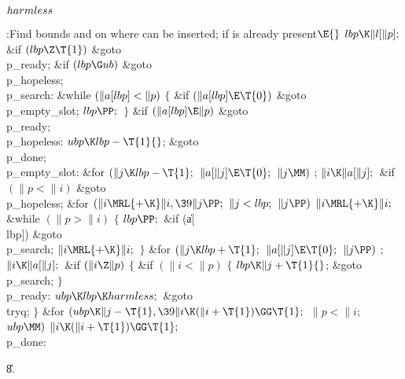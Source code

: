 \Y\B\4\D$\\{harmless}$ \5
\par
\Y\B\4:Find bounds  and  on where  can be
inserted;  if  is already present\X${}\E{}$\6
$\\{lbp}\K\|l[\|p];{}$\6
\&{if} ${}(\\{lbp}\Z\T{1}){}$\1\5
\&{goto} \\{p\_ready};\2\6
\&{if} ${}(\\{lbp}\G\\{ub}){}$\1\5
\&{goto} \\{p\_hopeless};\2\6
\4\\{p\_search}:\5
\&{while} ${}(\|a[\\{lbp}]<\|p){}$\5
${}\{{}$\1\6
\&{if} ${}(\|a[\\{lbp}]\E\T{0}){}$\1\5
\&{goto} \\{p\_empty\_slot};\2\6
${}\\{lbp}\PP;{}$\6
\4${}\}{}$\2\6
\&{if} ${}(\|a[\\{lbp}]\E\|p){}$\1\5
\&{goto} \\{p\_ready};\2\6
\4\\{p\_hopeless}:\5
${}\\{ubp}\K\\{lbp}-\T{1}{}$;\5
\&{goto} \\{p\_done};\6
\4\\{p\_empty\_slot}:\5
\&{for} ${}(\|j\K\\{lbp}-\T{1};{}$ ${}\|a[\|j]\E\T{0};{}$ ${}\|j\MM){}$\1\5
;\2\6
${}\|i\K\|a[\|j];{}$\6
\&{if} ${}(\|p<\|i){}$\1\5
\&{goto} \\{p\_hopeless};\2\6
\&{for} ${}(\|i\MRL{+{\K}}\|i,\39\|j\PP;{}$ ${}\|j<\\{lbp};{}$ ${}\|j\PP){}$\1\5
${}\|i\MRL{+{\K}}\|i;{}$\2\6
\&{while} ${}(\|p>\|i){}$\5
${}\{{}$\1\6
${}\\{lbp}\PP;{}$\6
\&{if} (\|a[\\{lbp}])\1\5
\&{goto} \\{p\_search};\2\6
${}\|i\MRL{+{\K}}\|i;{}$\6
\4${}\}{}$\2\6
\&{for} ${}(\|j\K\\{lbp}+\T{1};{}$ ${}\|a[\|j]\E\T{0};{}$ ${}\|j\PP){}$\1\5
;\2\6
${}\|i\K\|a[\|j];{}$\6
\&{if} ${}(\|i\Z\|p){}$\5
${}\{{}$\1\6
\&{if} ${}(\|i<\|p){}$\5
${}\{{}$\1\6
${}\\{lbp}\K\|j+\T{1}{}$;\5
\&{goto} \\{p\_search};\6
\4${}\}{}$\2\6
\4\\{p\_ready}:\5
${}\\{ubp}\K\\{lbp}\K\\{harmless};{}$\6
\&{goto} \\{tryq};\6
\4${}\}{}$\2\6
\&{for} ${}(\\{ubp}\K\|j-\T{1},\39\|i\K(\|i+\T{1})\GG\T{1};{}$ ${}\|p<\|i;{}$
${}\\{ubp}\MM){}$\1\5
${}\|i\K(\|i+\T{1})\GG\T{1};{}$\2\6
\4\\{p\_done}:\par
\U8.\fi

